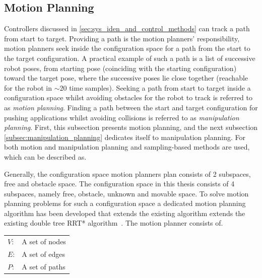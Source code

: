 \subsection{Motion Planning}%
\label{subsec:motion_planning}
Controllers discussed in \cref{sec:sys_iden_and_control_methods} can track a path from start to target. Providing a path is the motion planners' responsibility, motion planners seek inside the configuration space for a path from the start to the target configuration. A practical example of such a path is a list of successive robot poses, from starting pose (coinciding with the starting configuration) toward the target pose, where the successive poses lie close together (reachable for the robot in $\sim20$ time samples). Seeking a path from start to target inside a configuration space whilst avoiding obstacles for the robot to track is referred to as \textit{motion planning}. Finding a path between the start and target configuration for pushing applications whilst avoiding collisions is referred to as \textit{manipulation planning}. First, this subsection presents motion planning, and the next subsection \cref{subsec:manipulation_planning} dedicates itself to manipulation planning. For both motion and manipulation planning and sampling-based methods are used, which can be described as.\bs

\textit{}\bs

Generally, the configuration space motion planners plan consists of 2 subspaces, free and obstacle space. The configuration space in this thesis consists of 4 subspaces, namely free, obstacle, unknown and movable space. To solve motion planning problems for such a configuration space a dedicated motion planning algorithm has been developed that extends the existing algorithm extends the existing double tree \ac{RRT*} algorithm~\cite{chen_fast_2018}. The motion planner consists of.
\begin{center}
\begin{tabular}[t]{l p{10cm}}
$V$:& A set of nodes\\
$E$:& A set of edges\\
$P$:& A set of paths\\
\end{tabular}
\end{center}

